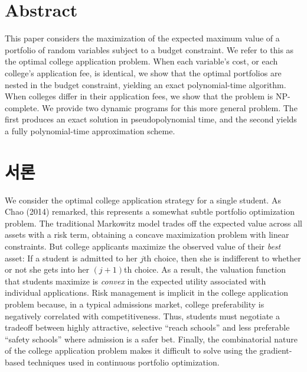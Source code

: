 \documentclass[12pt]{article} %
\author{Max Kapur}
\date{\today}                %
\newif\ifEN
\theoremstyle{definition}
\theoremstyle{definition}
\begin{document}
\maketitle
\section*{Abstract}
This paper considers the maximization of the expected maximum value of a portfolio of random variables subject to a budget constraint. We refer to this as the optimal college application problem. When each variable's cost, or each college's application fee, is identical, we show that the optimal portfolios are nested in the budget constraint, yielding an exact polynomial-time algorithm. When colleges differ in their application fees, we show that the problem is NP-complete. We provide two dynamic programs for this more general problem. The first produces an exact solution in pseudopolynomial time, and the second yields a fully polynomial-time approximation scheme. 
\pagebreak

\tableofcontents
\pagebreak


\ifEN \section{Introduction}  \else \section{서론} \fi
We consider the optimal college application strategy for a single student. As Chao (2014) remarked, this represents a somewhat subtle portfolio optimization problem. The traditional Markowitz model trades off the expected value across all assets with a risk term, obtaining a concave maximization problem with linear constraints. But college applicants maximize the observed value of their \emph{best} asset: If a student is admitted to her $j$th choice, then she is indifferent to whether or not she gets into her $(j+1)$th choice. As a result, the valuation function that students maximize is \emph{convex} in the expected utility associated with individual applications. Risk management is implicit in the college application problem because, in a typical admissions market, college preferability is negatively correlated with competitiveness. Thus, students must negotiate a tradeoff between highly attractive, selective “reach schools” and less preferable “safety schools” where admission is a safer bet. Finally, the combinatorial nature of the college application problem makes it difficult to solve using the gradient-based techniques used in continuous portfolio optimization.
\end{document}
